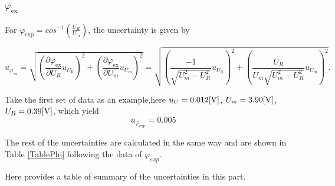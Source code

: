 \documentclass{article}
\begin{document}
\subsubsection{$\varphi_\text{ex}$}
For $\varphi_\text{exp}=cos^{-1}(\frac{U_R}{U_m})$, the uncertainty is given by

$$u_{\varphi_\text{ex}} = \sqrt{(\frac{\partial \varphi_\text{ex}}{\partial U_R}u_{U_\text{R}})^2 + (\frac{\partial \varphi_\text{ex}}{\partial U_m}u_{U_\text{m}})^2} = \sqrt{(\frac{-1}{\sqrt{U_m^2-U_R^2}}u_{U_\text{R}})^2 + (\frac{U_R}{U_m\sqrt{U_m^2-U_R^2}}u_{U_\text{m}})^2}.$$

Take the first set of data as an example,here $u_U=0.012[\rm V]$, $U_m=3.90[\rm V]$, $U_R=0.39[\rm V]$, which yield
$$u_{\varphi_\text{exp}} = 0.005$$

The rest of the uncertainties are calculated in the same way and are shown in Table \ref{TablePhi} following the data of $\varphi_{exp}$.

\newpage 
Here provides a table of summary of the uncertainties in this part.
\end{document}
